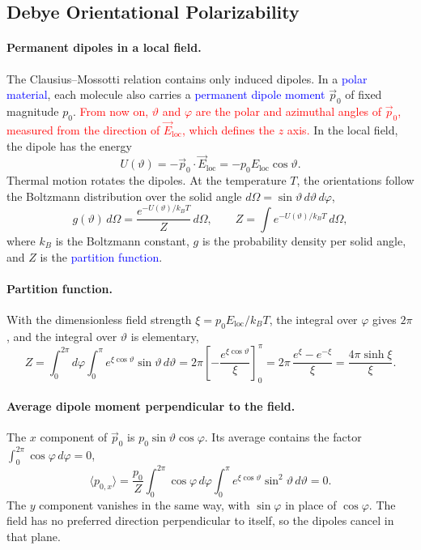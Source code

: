 \subsection{Debye Orientational Polarizability}
\label{subsec:debye}

\paragraph{Permanent dipoles in a local field.}
The Clausius--Mossotti relation contains only induced dipoles. In a \textcolor{blue}{polar material}, each molecule also carries a \textcolor{blue}{permanent dipole moment} $\vec p_0$ of fixed magnitude $p_0$. \textcolor{red}{From now on, $\vartheta$ and $\varphi$ are the polar and azimuthal angles of $\vec p_0$, measured from the direction of $\vec E_{\text{loc}}$, which defines the $z$ axis.} In the local field, the dipole has the energy
\begin{equation*}
    U(\vartheta) = -\vec p_0\cdot\vec E_{\text{loc}} = -p_0E_{\text{loc}}\cos\vartheta.
\end{equation*}
Thermal motion rotates the dipoles. At the temperature $T$, the orientations follow the Boltzmann distribution over the solid angle $d\Omega = \sin\vartheta\,d\vartheta\,d\varphi$,
\begin{equation*}
    g(\vartheta)\,d\Omega = \frac{e^{-U(\vartheta)/k_BT}}{Z}\,d\Omega,
    \qquad
    Z = \int e^{-U(\vartheta)/k_BT}\,d\Omega,
\end{equation*}
where $k_B$ is the Boltzmann constant, $g$ is the probability density per solid angle, and $Z$ is the \textcolor{blue}{partition function}.

\paragraph{Partition function.}
With the dimensionless field strength $\xi = p_0E_{\text{loc}}/k_BT$, the integral over $\varphi$ gives $2\pi$, and the integral over $\vartheta$ is elementary,
\begin{equation*}
    Z = \int_0^{2\pi} d\varphi \int_0^\pi e^{\xi\cos\vartheta}\sin\vartheta\,d\vartheta
    = 2\pi\left[-\frac{e^{\xi\cos\vartheta}}{\xi}\right]_0^\pi
    = 2\pi\,\frac{e^{\xi} - e^{-\xi}}{\xi}
    = \frac{4\pi\sinh\xi}{\xi}.
\end{equation*}

\paragraph{Average dipole moment perpendicular to the field.}
The $x$ component of $\vec p_0$ is $p_0\sin\vartheta\cos\varphi$. Its average contains the factor $\int_0^{2\pi}\cos\varphi\,d\varphi = 0$,
\begin{equation*}
    \langle p_{0,x}\rangle = \frac{p_0}{Z}\int_0^{2\pi}\cos\varphi\,d\varphi\int_0^\pi e^{\xi\cos\vartheta}\sin^2\vartheta\,d\vartheta = 0.
\end{equation*}
The $y$ component vanishes in the same way, with $\sin\varphi$ in place of $\cos\varphi$. The field has no preferred direction perpendicular to itself, so the dipoles cancel in that plane.

